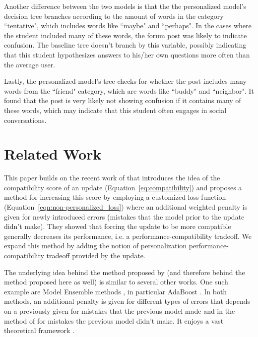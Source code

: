 \documentclass[letterpaper]{article} %
\theoremstyle{definition}
\begin{document}
Another difference between the two models is that the  the personalized model's decision tree branches according to the amount of words in the category ``tentative", which includes words like ``maybe" and ``perhaps". In the cases where the student included many of these words, the forum post was likely to indicate confusion.
The baseline tree doesn't branch by this variable, possibly indicating that this student hypothesizes answers to his/her own questions more often than the average user.

Lastly, the personalized model's tree checks for whether the post includes many words from the ``friend" category, which are words like ``buddy" and ``neighbor". It found that the post is very likely not showing confusion if it contains many of these words, which may indicate that this student often engages in social conversations.
%
\section{Related Work}

This paper builds on the recent work of \citet{bansalpdates} that introduces the idea of the compatibility score of an update (Equation~\ref{eq:compatibility}) and proposes a method for increasing this score by employing a customized loss function (Equation~\ref{eqn:non-personalized_loss}) where an additional weighted penalty is given for newly introduced errors (mistakes that the model prior to the update didn't make). They showed that forcing the update to be more compatible generally decreases its performance, i.e. a performance-compatibility tradeoff. We expand this method by adding the notion of personalization  performance-compatibility tradeoff provided by the update. %

The underlying idea behind the method proposed by \citet{bansalpdates} (and therefore behind the method proposed here as well) is similar to several other works. One such example are Model Ensemble methods \cite{opitz1999popular}, in particular AdaBoost \cite{freund1996experiments}. In both methods, an additional penalty is given for different types of errors that depends on a previously  given for mistakes that the previous model made and in the method of \citet{bansalpdates} for mistakes the previous model didn't make.
It  enjoys a vast theoretical framework \cite{freund1996experiments}.
\end{document}
